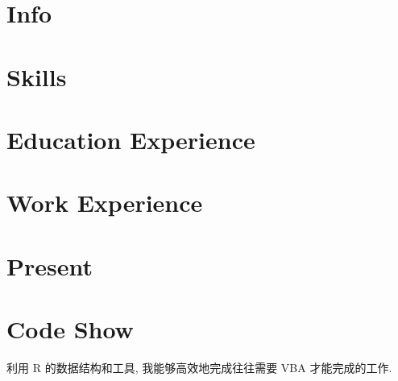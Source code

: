 \documentclass[a4paper]{article}
\begin{document}
	\section*{Info}
		
	\section*{Skills}
		
	\section*{Education Experience}
		
	\section*{Work Experience}
		
	\section*{Present}
		
	\section*{Code Show}
		利用 R 的数据结构和工具, 我能够高效地完成往往需要 VBA 才能完成的工作.
			
			
		
			
\end{document}
